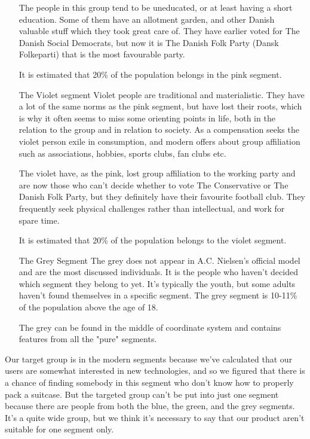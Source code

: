 \begin{itemize}
The people in this group tend to be uneducated, or at least having a short education. Some of them have an allotment garden, and other Danish valuable stuff which they took great care of. They have earlier voted for The Danish Social Democrats, but now it is The Danish Folk Party (Dansk Folkeparti) that is the most favourable  party.

It is estimated that 20\% of the population belongs in the pink segment.

\item[The Violet segment]
Violet people are traditional and materialistic. They have a lot of the same norms as the pink segment, but have lost their roots, which is why it often seems to miss some orienting points in life, both in the relation to the group and in relation to society. As a compensation seeks the violet person exile in consumption, and modern offers about group affiliation such as associations, hobbies, sports clubs, fan clubs etc. 

The violet have, as the pink, lost group affiliation to the working party and are now those who can't decide whether to vote The Conservative or The Danish Folk Party, but they definitely have their favourite football club. They frequently seek physical challenges rather than intellectual, and work for spare time.

It is estimated that 20\% of the population belongs to the violet segment.

\item[The Grey Segment]
The grey does not appear in A.C. Nielsen's official model and are the most discussed individuals. It is the people who haven't decided which segment they belong to yet. It's typically the youth, but some adults haven't found themselves in a specific segment. The grey segment is 10-11\% of the population above the age of 18.

The grey can be found in the middle of coordinate system and contains features from all the "pure" segments.
\end{itemize}
\citep{minerva}

Our target group is in the modern segments because we've calculated that our users are somewhat interested in new technologies, and so we figured that there is a chance of finding somebody in this segment who don't know how to properly pack a suitcase. But the targeted group can't be put into just one segment because there are people from both the blue, the green, and the grey segments. It's a quite wide group, but we think it's necessary to say that our product aren't suitable for one segment only.